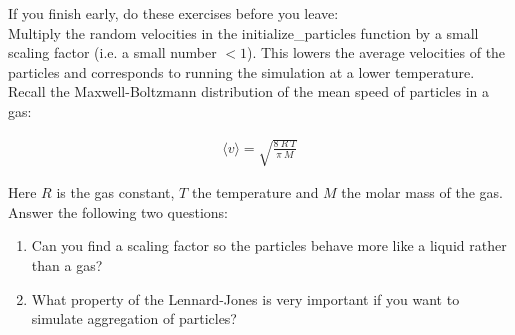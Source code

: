 \documentclass{article}
\begin{document}
\newpage

If you finish early, do these exercises before you leave:\\

Multiply the random velocities in the initialize\_particles function by a small
scaling factor (i.e. a small number $< 1$).
This lowers the average velocities of the particles and corresponds to running
the simulation at a lower temperature.
Recall the Maxwell-Boltzmann distribution of the mean speed of
particles in a gas:

\begin{align}
    \langle v \rangle = \sqrt{ \frac{8\ R \ T}{\pi\ M}}
\end{align}

Here $R$ is the gas constant, $T$ the temperature and $M$ the molar mass of the
gas.\\

Answer the following two questions:

\begin{enumerate}
    \item Can you find a scaling factor so the particles behave more like a liquid rather than a gas? 
    \item What property of the Lennard-Jones is very important if you want to simulate aggregation of particles?
\end{enumerate}


\end{document}
